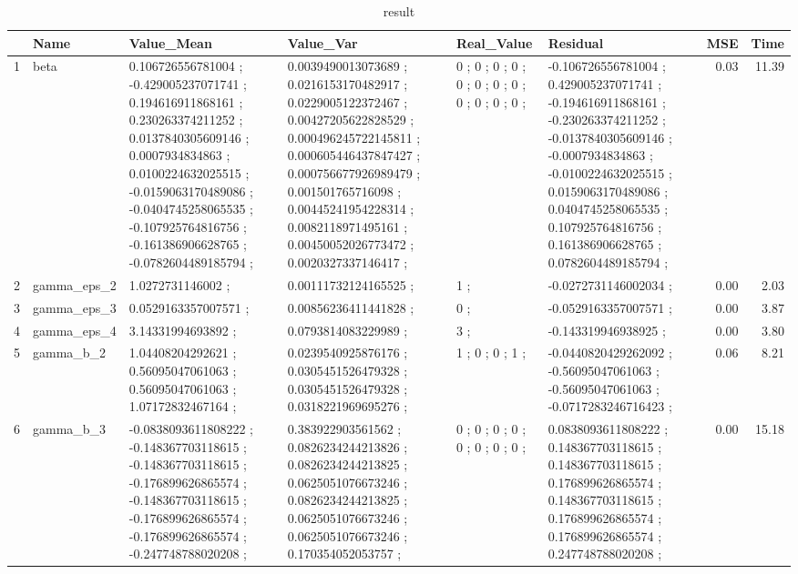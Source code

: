 \begin{table}[ht]
\begin{center}
\begin{tabular}{rlllllrr}
  \hline
 & Name & Value\_Mean & Value\_Var & Real\_Value & Residual & MSE & Time \\ 
  \hline
1 & beta &  0.106726556781004 ; -0.429005237071741 ; 0.194616911868161 ; 0.230263374211252 ; 0.0137840305609146 ; 0.0007934834863 ; 0.0100224632025515 ; -0.0159063170489086 ; -0.0404745258065535 ; -0.107925764816756 ; -0.161386906628765 ; -0.0782604489185794 ; &  0.0039490013073689 ; 0.0216153170482917 ; 0.0229005122372467 ; 0.00427205622828529 ; 0.000496245722145811 ; 0.000605446437847427 ; 0.000756677926989479 ; 0.001501765716098 ; 0.00445241954228314 ; 0.0082118971495161 ; 0.00450052026773472 ; 0.0020327337146417 ; &  0 ; 0 ; 0 ; 0 ; 0 ; 0 ; 0 ; 0 ; 0 ; 0 ; 0 ; 0 ; &  -0.106726556781004 ; 0.429005237071741 ; -0.194616911868161 ; -0.230263374211252 ; -0.0137840305609146 ; -0.0007934834863 ; -0.0100224632025515 ; 0.0159063170489086 ; 0.0404745258065535 ; 0.107925764816756 ; 0.161386906628765 ; 0.0782604489185794 ; & 0.03 & 11.39 \\ 
  2 & gamma\_eps\_2 &  1.0272731146002 ; &  0.00111732124165525 ; &  1 ; &  -0.0272731146002034 ; & 0.00 & 2.03 \\ 
  3 & gamma\_eps\_3 &  0.0529163357007571 ; &  0.00856236411441828 ; &  0 ; &  -0.0529163357007571 ; & 0.00 & 3.87 \\ 
  4 & gamma\_eps\_4 &  3.14331994693892 ; &  0.0793814083229989 ; &  3 ; &  -0.143319946938925 ; & 0.00 & 3.80 \\ 
  5 & gamma\_b\_2 &  1.04408204292621 ; 0.56095047061063 ; 0.56095047061063 ; 1.07172832467164 ; &  0.0239540925876176 ; 0.0305451526479328 ; 0.0305451526479328 ; 0.0318221969695276 ; &  1 ; 0 ; 0 ; 1 ; &  -0.0440820429262092 ; -0.56095047061063 ; -0.56095047061063 ; -0.0717283246716423 ; & 0.06 & 8.21 \\ 
  6 & gamma\_b\_3 &  -0.0838093611808222 ; -0.148367703118615 ; -0.148367703118615 ; -0.176899626865574 ; -0.148367703118615 ; -0.176899626865574 ; -0.176899626865574 ; -0.247748788020208 ; &  0.383922903561562 ; 0.0826234244213826 ; 0.0826234244213825 ; 0.0625051076673246 ; 0.0826234244213825 ; 0.0625051076673246 ; 0.0625051076673246 ; 0.170354052053757 ; &  0 ; 0 ; 0 ; 0 ; 0 ; 0 ; 0 ; 0 ; &  0.0838093611808222 ; 0.148367703118615 ; 0.148367703118615 ; 0.176899626865574 ; 0.148367703118615 ; 0.176899626865574 ; 0.176899626865574 ; 0.247748788020208 ; & 0.00 & 15.18 \\ 
   \hline
\end{tabular}
\caption{result}
\end{center}
\end{table}
